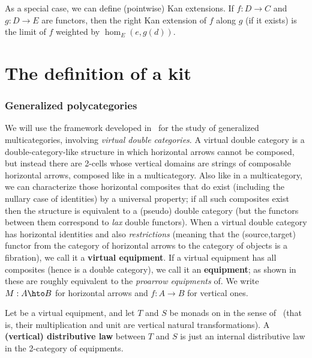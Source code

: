 \documentclass{amsart}
\newcommand{\K}{\bbK}
\def\mor#1{\hom_{#1}}
\begin{document}
As a special case, we can define (pointwise) Kan extensions. If $f:D\to C$ and $g:D\to E$ are functors, then the right Kan extension of $f$ along $g$ (if it exists) is the limit of $f$ weighted by $\mor{E}(e,g(d))$.

\part{The definition of a kit}
\label{part:def}

\section{Generalized polycategories}
\label{sec:genpoly}

We will use the framework developed in~\cite{cs:multicats} for the study of generalized multicategories, involving \emph{virtual double categories}.
A virtual double category is a double-category-like structure in which horizontal arrows cannot be composed, but instead there are 2-cells whose vertical domains are strings of composable horizontal arrows, composed like in a multicategory.
Also like in a multicategory, we can characterize those horizontal composites that do exist (including the nullary case of identities) by a universal property; if all such composites exist then the structure is equivalent to a (pseudo) double category (but the functors between them correspond to \emph{lax} double functors).
When a virtual double category has horizontal identities and also \emph{restrictions} (meaning that the (source,target) functor from the category of horizontal arrows to the category of objects is a fibration), we call it a \textbf{virtual equipment}.
If a virtual equipment has all composites (hence is a double category), we call it an \textbf{equipment}; as shown in~\cite{shulman:frbi} these are roughly equivalent to the \emph{proarrow equipments} of\cite{wood:proarrows-i}.
We write $M:A\hto B$ for horizontal arrows and $f:A\to B$ for vertical ones.

Let \K be a virtual equipment, and let $T$ and $S$ be monads on \bbK in the sense of~\cite{cs:multicats} (that is, their multiplication and unit are vertical natural transformations).
A \textbf{(vertical) distributive law} between $T$ and $S$ is just an internal distributive law in the 2-category of equipments.
\end{document}
